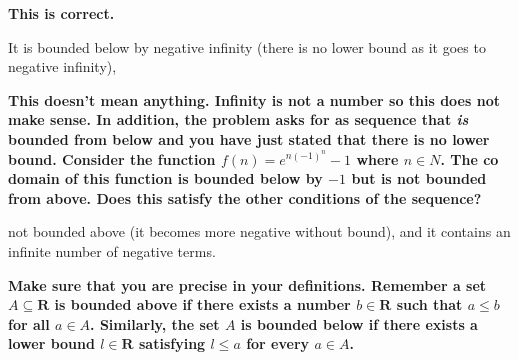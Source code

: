 \documentclass{report}
\begin{document}
\par
\textbf{This is correct.}

It is bounded below by negative infinity (there is no lower bound as it goes to negative infinity), 
\par
\textbf{
  This doesn't mean anything. Infinity is not a number so this does not make sense. In addition, the problem asks for as sequence that \textit{is} bounded from below and you have just stated that there is no lower bound. Consider the function $f(n) =e^{n(-1)^n} -1$ where $n \in N$. The co domain of this function is bounded below by $-1$ but is not bounded from above. Does this satisfy the other conditions of the sequence?
}

not bounded above (it becomes more negative without bound), and it contains an infinite number of negative terms.

\textbf{Make sure that you are precise in your definitions.
Remember a set $A \subseteq \mathbf{R}$ is bounded above if there exists a number $b \in \mathbf{R}$ such that $a \leqslant b$ for all $a \in A$.  Similarly, the set $A$ is bounded below if there exists a lower bound $l \in \mathbf{R}$ satisfying $l \leqslant a$ for every $a \in A$.}
\end{document}
